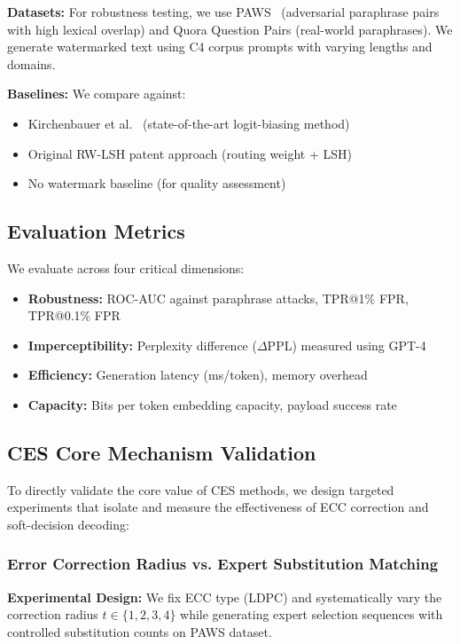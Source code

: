 \textbf{Datasets:} For robustness testing, we use PAWS~\cite{zhang2019paws} (adversarial paraphrase pairs with high lexical overlap) and Quora Question Pairs (real-world paraphrases). We generate watermarked text using C4 corpus prompts with varying lengths and domains.

\textbf{Baselines:} We compare against:
\begin{itemize}
\item Kirchenbauer et al.~\cite{kirchenbauer2023watermark} (state-of-the-art logit-biasing method)
\item Original RW-LSH patent approach (routing weight + LSH)
\item No watermark baseline (for quality assessment)
\end{itemize}

\subsection{Evaluation Metrics}

We evaluate across four critical dimensions:

\begin{itemize}
\item \textbf{Robustness:} ROC-AUC against paraphrase attacks, TPR@1\% FPR, TPR@0.1\% FPR
\item \textbf{Imperceptibility:} Perplexity difference ($\Delta$PPL) measured using GPT-4
\item \textbf{Efficiency:} Generation latency (ms/token), memory overhead
\item \textbf{Capacity:} Bits per token embedding capacity, payload success rate
\end{itemize}

\subsection{CES Core Mechanism Validation}

To directly validate the core value of CES methods, we design targeted experiments that isolate and measure the effectiveness of ECC correction and soft-decision decoding:

\subsubsection{Error Correction Radius vs. Expert Substitution Matching}

\textbf{Experimental Design:} We fix ECC type (LDPC) and systematically vary the correction radius $t \in \{1,2,3,4\}$ while generating expert selection sequences with controlled substitution counts on PAWS dataset.

